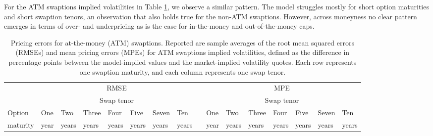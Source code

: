 \documentclass[11pt,a4paper,english,oneside]{book}
\numberwithin{equation}{chapter}
\begin{document}
For the ATM swaptions implied volatilities in Table \ref{Table3}, we observe a similar pattern. The model struggles mostly for short option maturities and short swaption tenors, an observation that also holds true for the non-ATM swaptions. However, across moneyness no clear pattern emerges in terms of over- and underpricing as is the case for in-the-money and out-of-the-money caps.



\begin{table}
\caption[Pricing Errors for ATM Swaptions]{ Pricing errors for at-the-money (ATM) swaptions. \newline
Reported are sample averages of the root mean squared errors (RMSEs) and mean pricing
errors (MPEs) for ATM swaptions implied volatilities, defined as the difference in percentage points between the model-implied values and the market-implied volatility quotes. Each row represents one swaption maturity, and each column represents one swap tenor.}
\label{Table3}
\vspace{0.2cm}
\setlength{\tabcolsep}{6pt}
\begin{tabular}{lrrrrrrrlrrrrrrr}
\toprule &
\multicolumn{7}{c}{RMSE} &&
\multicolumn{7}{c}{MPE} \\
 \cmidrule(l){2-9}  \cmidrule(l){10-16}
& \multicolumn{7}{c}{Swap tenor} &&
\multicolumn{7}{c}{Swap tenor} \\
 \cmidrule(l){2-9}  \cmidrule(l){10-16}
\multicolumn{1}{l}{{Option}} & \multicolumn{1}{l}{One} & \multicolumn{1}{l}{Two} & \multicolumn{1}{l}{Three} & \multicolumn{1}{l}{Four} &
\multicolumn{1}{l}{Five} & \multicolumn{1}{l}{Seven} & \multicolumn{1}{l}{Ten} & & \multicolumn{1}{l}{One} &  \multicolumn{1}{l}{Two} & \multicolumn{1}{l}{Three} & \multicolumn{1}{l}{Four} & \multicolumn{1}{l}{Five} & \multicolumn{1}{l}{Seven} & \multicolumn{1}{l}{Ten} \\

\multicolumn{1}{l}{maturity} & \multicolumn{1}{l}{year} & \multicolumn{1}{l}{years} & \multicolumn{1}{l}{years} & \multicolumn{1}{l}{years} &
\multicolumn{1}{l}{years} & \multicolumn{1}{l}{years} & \multicolumn{1}{l}{years} & & \multicolumn{1}{l}{year} &  \multicolumn{1}{l}{years} & \multicolumn{1}{l}{years} & \multicolumn{1}{l}{years} & \multicolumn{1}{l}{years} & \multicolumn{1}{l}{years} & \multicolumn{1}{l}{years} \\



\end{tabular}
\end{table}
\end{document}

